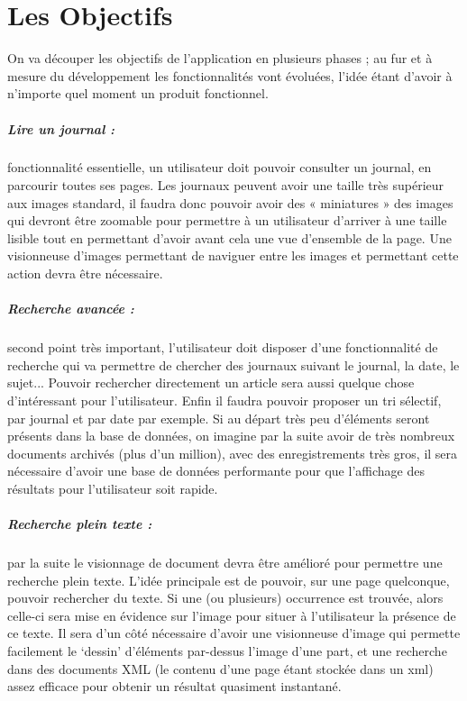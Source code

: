 \section{Les Objectifs}
	\label{sec:objectifs}

    On va découper les objectifs de l’application en plusieurs phases ; au fur et à mesure
    du développement les fonctionnalités vont évoluées, l’idée étant d’avoir à n’importe quel moment un produit fonctionnel.

    \subparagraph{Lire un journal :} 
    fonctionnalité essentielle, un utilisateur doit pouvoir consulter un journal, en parcourir
    toutes ses pages. Les journaux peuvent avoir une taille très supérieur aux images standard,
    il faudra donc pouvoir avoir des « miniatures » des images qui devront être zoomable pour
    permettre à un utilisateur d’arriver à une taille lisible tout en permettant d’avoir avant
    cela une vue d’ensemble de la page. Une visionneuse d’images permettant de naviguer entre
    les images et permettant cette action devra être nécessaire.
    
    \subparagraph{Recherche avancée :}
    second point très important, l’utilisateur doit disposer d’une fonctionnalité de recherche
    qui va permettre de chercher des journaux suivant le journal, la date, le sujet... Pouvoir rechercher
    directement un article sera aussi quelque chose d’intéressant pour l’utilisateur. Enfin il faudra pouvoir
    proposer un tri sélectif, par journal et par date par exemple. Si au départ très peu d’éléments seront
    présents dans la base de données, on imagine par la suite avoir de très nombreux documents archivés
    (plus d’un million), avec des enregistrements très gros, il sera nécessaire d’avoir une base de données
    performante pour que l’affichage des résultats pour l’utilisateur soit rapide.

    \subparagraph{Recherche plein texte :}
    par la suite le visionnage de document devra être amélioré pour permettre une recherche plein texte.
    L’idée principale est de pouvoir, sur une page quelconque, pouvoir rechercher du texte. Si une (ou plusieurs)
    occurrence est trouvée, alors celle-ci sera mise en évidence sur l’image pour situer à l’utilisateur
    la présence de ce texte. Il sera d’un côté nécessaire d’avoir une visionneuse d’image qui permette facilement
    le ‘dessin’ d’éléments par-dessus l’image d’une part, et une recherche dans des documents XML
    (le contenu d’une page étant stockée dans un xml) assez efficace pour obtenir un résultat quasiment instantané.

